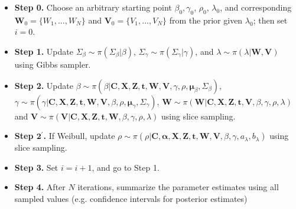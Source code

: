 \documentclass[a4paper, 12pt]{article}
\begin{document}
\begin{itemize}
	\item[] {\textbf{Step 0.}} Choose an arbitrary starting point ${\beta}_0, {\gamma}_0$, $\rho_0$, $\lambda_0$, and corresponding $\mathbf{W}_0=\{W_1,...,W_N\}$ and $\mathbf{V}_0=\{V_1,...,V_N\}$ from the prior given $\lambda_0$; then set $i = 0$.
	\item[] {\textbf{Step 1.}} Update $\Sigma_{\beta} \sim \pi(\Sigma_{\beta}|{\beta})$, $\Sigma_{\gamma} \sim \pi(\Sigma_{\gamma}|{\gamma})$, and $\lambda \sim \pi(\lambda|\mathbf{W}, \mathbf{V})$ using Gibbs sampler.
	\item[] {\textbf{Step 2.}} Update ${\beta}\sim \pi({\beta}|\mathbf{C}, \mathbf{X}, \mathbf{Z}, \mathbf{t}, \mathbf{W}, \mathbf{V}, {\gamma}, \rho, \mathbf{\mu}_{\beta}, \Sigma_{\beta})$, ${\gamma}\sim \pi({\gamma}|\mathbf{C}, \mathbf{X}, \mathbf{Z}, \mathbf{t}, \mathbf{W}, \mathbf{V}, {\beta},\rho, \mathbf{\mu}_{\gamma}, \Sigma_{\gamma})$, $\mathbf{W}\sim \pi(\mathbf{W}|\mathbf{C}, \mathbf{X}, \mathbf{Z}, \mathbf{t}, \mathbf{V}, {\beta}, \gamma, \rho, \lambda)$ and $\mathbf{V}\sim \pi(\mathbf{V}|\mathbf{C}, \mathbf{X}, \mathbf{Z}, \mathbf{t}, \mathbf{W}, {\beta}, \gamma, \rho, \lambda)$ using slice sampling. 
	\item[] {\textbf{Step $\mathbf{2}^\prime$.}} If Weibull, update $\rho \sim \pi(\rho|\mathbf{C}, \mathbf{\alpha}, \mathbf{X}, \mathbf{Z}, \mathbf{t}, \mathbf{W},  \mathbf{V}, {\beta}, {\gamma}, a_{\lambda}, b_{\lambda})$  using slice sampling.
	\item[] {\textbf{Step 3.}} Set $i = i + 1$, and go to Step 1.
	\item[] {\textbf{Step 4.}} After $N$ iterations, summarize the parameter estimates using all sampled values (e.g. confidence intervals for posterior estimates)
\end{itemize}
\end{document}
